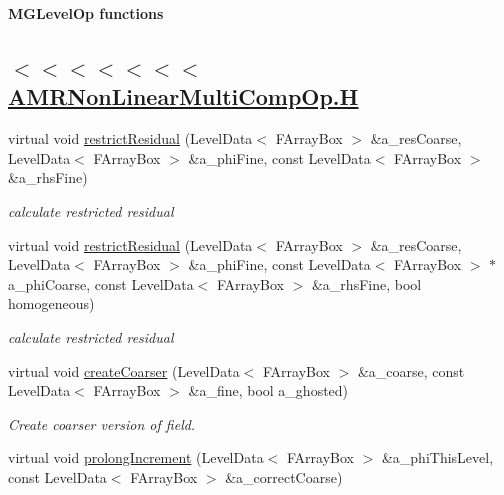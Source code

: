 \begin{Indent}{\bf M\-G\-Level\-Op functions}\par
{\em \subsection*{$<$$<$$<$$<$$<$$<$$<$ \hyperlink{_a_m_r_non_linear_multi_comp_op_8_h_source}{A\-M\-R\-Non\-Linear\-Multi\-Comp\-Op.\-H} }}\begin{DoxyCompactItemize}
\item 
virtual void \hyperlink{class_a_m_r_non_linear_multi_comp_op_ad0f58cb65ab237d61874f2aeae1a4da3}{restrict\-Residual} (Level\-Data$<$ F\-Array\-Box $>$ \&a\-\_\-res\-Coarse, Level\-Data$<$ F\-Array\-Box $>$ \&a\-\_\-phi\-Fine, const Level\-Data$<$ F\-Array\-Box $>$ \&a\-\_\-rhs\-Fine)
\begin{DoxyCompactList}\small\item\em calculate restricted residual \end{DoxyCompactList}\item 
\hypertarget{class_a_m_r_non_linear_multi_comp_op_a65b95bc4127ffdfab47bd5a81acf2772}{virtual void \hyperlink{class_a_m_r_non_linear_multi_comp_op_a65b95bc4127ffdfab47bd5a81acf2772}{restrict\-Residual} (Level\-Data$<$ F\-Array\-Box $>$ \&a\-\_\-res\-Coarse, Level\-Data$<$ F\-Array\-Box $>$ \&a\-\_\-phi\-Fine, const Level\-Data$<$ F\-Array\-Box $>$ $\ast$a\-\_\-phi\-Coarse, const Level\-Data$<$ F\-Array\-Box $>$ \&a\-\_\-rhs\-Fine, bool homogeneous)}\label{class_a_m_r_non_linear_multi_comp_op_a65b95bc4127ffdfab47bd5a81acf2772}

\begin{DoxyCompactList}\small\item\em calculate restricted residual \end{DoxyCompactList}\item 
\hypertarget{class_a_m_r_non_linear_multi_comp_op_ac3ea29dd436c89aafde25c8f33fdb30d}{virtual void \hyperlink{class_a_m_r_non_linear_multi_comp_op_ac3ea29dd436c89aafde25c8f33fdb30d}{create\-Coarser} (Level\-Data$<$ F\-Array\-Box $>$ \&a\-\_\-coarse, const Level\-Data$<$ F\-Array\-Box $>$ \&a\-\_\-fine, bool a\-\_\-ghosted)}\label{class_a_m_r_non_linear_multi_comp_op_ac3ea29dd436c89aafde25c8f33fdb30d}

\begin{DoxyCompactList}\small\item\em Create coarser version of field. \end{DoxyCompactList}\item 
\hypertarget{class_a_m_r_non_linear_multi_comp_op_a47ff0ed449857310593c55c4d192a581}{virtual void \hyperlink{class_a_m_r_non_linear_multi_comp_op_a47ff0ed449857310593c55c4d192a581}{prolong\-Increment} (Level\-Data$<$ F\-Array\-Box $>$ \&a\-\_\-phi\-This\-Level, const Level\-Data$<$ F\-Array\-Box $>$ \&a\-\_\-correct\-Coarse)}\label{class_a_m_r_non_linear_multi_comp_op_a47ff0ed449857310593c55c4d192a581}


\end{DoxyCompactItemize}
\end{Indent}
